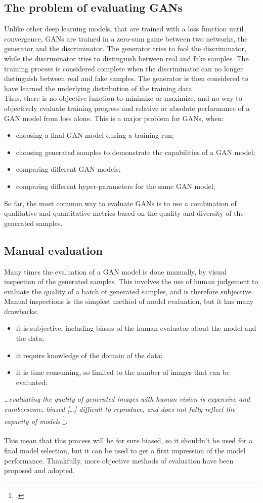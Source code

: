 \subsection{The problem of evaluating GANs}
\label{subsec:problem-evaluating-gans}
Unlike other deep learning models, that are trained with a loss function until convergence, GANs are trained in a zero-sum game between two networks, the generator and the discriminator. 
The generator tries to fool the discriminator, while the discriminator tries to distinguish between real and fake samples. 
The training process is considered complete when the discriminator can no longer distinguish between real and fake samples. 
The generator is then considered to have learned the underlying distribution of the training data.\\
Thus, there is no objective function to minimize or maximize, and no way to objectively evaluate training progress and relative or absolute performance of a GAN model from loss alone.
This is a major problem for GANs, when:
\begin{itemize}
    \item choosing a final GAN model during a training run;
    \item choosing generated samples to demonstrate the capabilities of a GAN model;
    \item comparing different GAN models;
    \item comparing different hyper-parameters for the same GAN model;
\end{itemize}
So far, the most common way to evaluate GANs is to use a combination of qualitative and quantitative metrics based on the quality and diversity of the generated samples.
\subsection{Manual evaluation}
\label{subsec:manual-evaluation}
Many times the evaluation of a GAN model is done manually, by visual inspection of the generated samples.
This involves the use of human judgement to evaluate the quality of a batch of generated samples, and is therefore subjective.
Manual inspections is the simplest method of model evaluation, but it has many drawbacks:
\begin{itemize}
    \item it is subjective, including biases of the human evaluator about the model and the data;
    \item it require knowledge of the domain of the data;
    \item it is time consuming, so limited to the number of images that can be evaluated;
\end{itemize}
\emph{…evaluating the quality of generated images with human vision is expensive and cumbersome, biased […] difficult to reproduce, and does not fully reflect the capacity of models}
\footcite{paper:ganeval}.\\\\
This mean that this process will be for sure biased, so it shouldn't be used for a final model selection,
 but it can be used to get a first impression of the model performance.
Thankfully, more objective methods of evaluation have been proposed and adopted.
